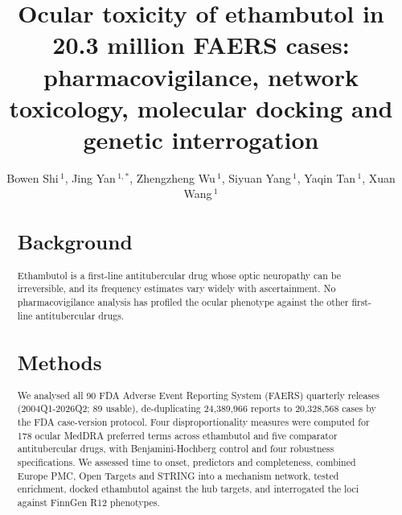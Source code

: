 \documentclass[utf8]{FrontiersinVancouver}
\def\firstAuthorLast{Shi {et~al.}}
\def\Authors{Bowen Shi\,$^{1}$, Jing Yan\,$^{1,*}$, Zhengzheng Wu\,$^{1}$, Siyuan Yang\,$^{1}$, Yaqin Tan\,$^{1}$, Xuan Wang\,$^{1}$}
\begin{document}
\onecolumn
{}

\title[Ethambutol ocular toxicity in 20.3 million FAERS cases]{Ocular toxicity of ethambutol in 20.3 million FAERS cases: pharmacovigilance, network toxicology, molecular docking and genetic interrogation}

\author[\firstAuthorLast ]{\Authors}
\address{}
\correspondance{}

\extraAuth{}

\maketitle

\begin{abstract}
\section{Background} Ethambutol is a first-line antitubercular drug whose optic neuropathy can be irreversible, and its frequency estimates vary widely with ascertainment. No pharmacovigilance analysis has profiled the ocular phenotype against the other first-line antitubercular drugs.
\section{Methods} We analysed all 90 FDA Adverse Event Reporting System (FAERS) quarterly releases (2004Q1-2026Q2; 89 usable), de-duplicating 24,389,966 reports to 20,328,568 cases by the FDA case-version protocol. Four disproportionality measures were computed for 178 ocular MedDRA preferred terms across ethambutol and five comparator antitubercular drugs, with Benjamini-Hochberg control and four robustness specifications. We assessed time to onset, predictors and completeness, combined Europe PMC, Open Targets and STRING into a mechanism network, tested enrichment, docked ethambutol against the hub targets, and interrogated the loci against FinnGen R12 phenotypes.

\end{abstract}
\end{document}
